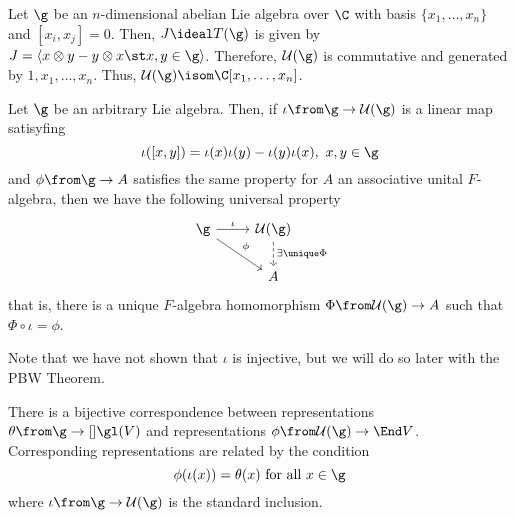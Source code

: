 \documentclass[11pt,leqno,oneside]{amsart}
\numberwithin{thm}{section}
\newcommand{\T}{T}
\newcommand{\U}{\mathcal{U}}
\begin{document}
\begin{example}
  Let \(\g\) be an \(n\)-dimensional abelian Lie algebra over \(\C\)
  with basis \(\{x_1, \ldots, x_n\}\) and \([x_i,x_j] = 0\). Then, \(J
  \ideal \T(\g)\) is given by \(J = \langle x \otimes y - y \otimes x
  \st x,y \in \g
  \rangle\). Therefore, \(\U(\g)\) is commutative and generated by
  \(1, x_1 ,\ldots, x_n\). Thus, \(\U(\g) \isom \C[x_1, \ldots,
  x_n]\). 
\end{example}
\begin{prop}
  Let \(\g\) be an arbitrary Lie algebra. Then, if \(\iota \from \g
  \to \U(\g)\) is a linear map satisyfing \[
    \iota([x,y]) = \iota(x)\iota(y) - \iota(y)\iota(x), \ x,y \in \g
  \]
  and \(\phi \from \g \to A\) satisfies the same property for \(A\) an
  associative unital \(F\)-algebra, then we have the following
  universal property
  \[
    \begin{tikzcd}
      \g \ar[rd, "\phi"] \ar[r, "\iota"] & \U(\g) \ar[d, dashed,
      "\exists \unique \Phi"]\\
      & A
    \end{tikzcd}
  \]
  that is, there is a unique \(F\)-algebra homomorphism \(\Phi \from
  \U(\g) \to A\) such that \(\Phi \circ \iota = \phi\).
\end{prop}
\begin{rmk}
  Note that we have not shown that \(\iota\) is injective, but we will
  do so later with the PBW Theorem.
\end{rmk}
\begin{prop}
  There is a bijective correspondence between representations \(\theta
  \from \g \to[] \gl(V)\) and representations \(\phi \from \U(\g)
  \to \End V\). Corresponding representations are
  related by the condition \[
    \phi(\iota(x)) = \theta(x) \text{ for all }x \in \g
  \]
  where \(\iota \from \g \to \U(\g)\) is the standard inclusion.
\end{prop}
\end{document}
